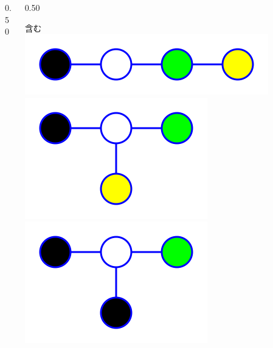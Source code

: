 \begin{tcolorbox}[title={\Large Gradient~Boosting~Decition~Tree}]
\begin{columns}[t]
\begin{column}{0.50\hsize}
\begin{tcolorbox}[colback=white]
		\end{tcolorbox}
		\end{column}
		\begin{column}{0.50\hsize}
		\begin{tcolorbox}[colback=white,colframe=blue]
			含む \\
			\includegraphics[height=0.7\baselineskip]{img/graph/g08b.png}
			\includegraphics[height=1.4\baselineskip]{img/graph/g05b.png}
			\includegraphics[height=1.4\baselineskip]{img/graph/g06b.png}
		\end{tcolorbox}
		\end{column}
	\end{columns}



\end{tcolorbox}
